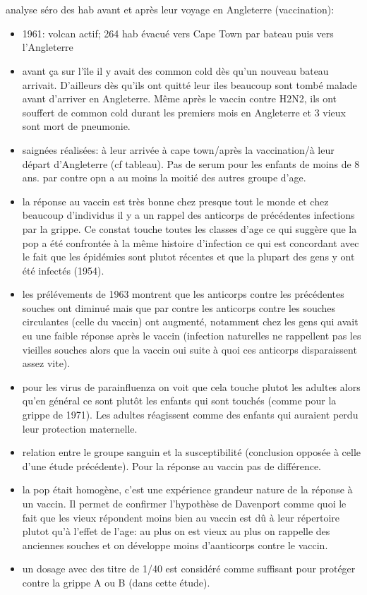 \documentclass{article}
\begin{document}
\section{\citet{Tyrrell1967}}
analyse séro des hab avant et après leur voyage en Angleterre (vaccination):
\begin{itemize}
\item 1961: volcan actif; 264 hab évacué vers Cape Town par bateau puis vers l'Angleterre
\item avant \c ca sur l'île il y avait des common cold dès qu'un nouveau bateau arrivait. D'ailleurs dès qu'ils ont quitté leur iles beaucoup sont tombé malade avant d'arriver en Angleterre. Même après le vaccin contre H2N2, ils ont souffert de common cold durant les premiers mois en Angleterre et 3 vieux sont mort de pneumonie.
\item saignées réalisées: à leur arrivée à cape town/après la vaccination/à leur départ d'Angleterre (cf tableau). Pas de serum pour les enfants de moins de 8 ans. par contre opn a au moins la moitié des autres groupe d'age.
\item la réponse au vaccin est très bonne chez presque tout le monde et chez beaucoup d'individus il y a un rappel des anticorps de précédentes infections par la grippe. Ce constat touche toutes les classes d'age ce qui suggère que la pop a été confrontée à la même histoire d'infection ce qui est concordant avec le fait que les épidémies sont plutot récentes et que la plupart des gens y ont été infectés (1954).
\item les prélévements de 1963 montrent que les anticorps contre les précédentes souches ont diminué mais que par contre les anticorps contre les souches circulantes (celle du vaccin) ont augmenté, notamment chez les gens qui avait eu une faible réponse après le vaccin (infection naturelles ne rappellent pas les vieilles souches alors que la vaccin oui suite à quoi ces anticorps disparaissent assez vite).
\item pour les virus de parainfluenza on voit que cela touche plutot les adultes alors qu'en général ce sont plutôt les enfants qui sont touchés (comme pour la grippe de 1971). Les adultes réagissent comme des enfants qui auraient perdu leur protection maternelle.
\item relation entre le groupe sanguin et la susceptibilité (conclusion opposée à celle d'une étude précédente). Pour la réponse au vaccin pas de différence. 
\item la pop était homogène, c'est une expérience grandeur nature de la réponse à un vaccin. Il permet de confirmer l'hypothèse de Davenport comme quoi le fait que les vieux répondent moins bien au vaccin est dû à leur répertoire plutot qu'à l'effet de l'age: au plus on est vieux au plus on rappelle des anciennes souches et on développe moins d'aanticorps contre le vaccin.
\item un dosage avec des titre de 1/40 est considéré comme suffisant pour protéger contre la grippe A ou B (dans cette étude). 
\end{itemize}
\end{document}
